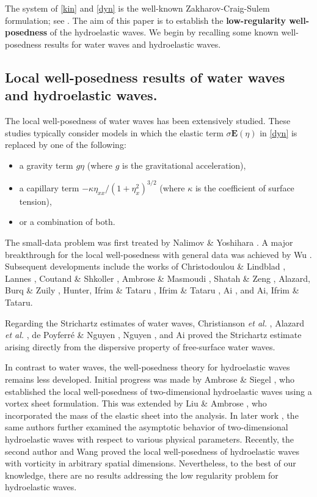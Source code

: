 \documentclass[10pt]{amsart}
\theoremstyle{remark}
\theoremstyle{definition}
\numberwithin{equation}{section}
\begin{document}
The system of \eqref{kin} and \eqref{dyn} is the well-known Zakharov-Craig-Sulem formulation; see \cite{MR2129655,MR1158383}.
 The aim of this paper is to establish the \textbf{low-regularity well-posedness} of the hydroelastic waves.
We begin by recalling some known well-posedness results for water waves and hydroelastic waves.

\subsection{Local well-posedness results of water waves and hydroelastic waves.}
The local well-posedness of water waves has been extensively studied.
These studies typically consider models in which the elastic term \(\sigma\mathbf{E}(\eta)\) in \eqref{dyn} is replaced by one of the following:
\begin{itemize}
    \item a gravity term \(g\eta\) (where \(g\) is the gravitational acceleration),
    \item a capillary term \(-\kappa \eta_{xx}/(1+\eta_x^2)^{3/2}\) (where \(\kappa\) is the coefficient of surface tension),
    \item or a combination of both.
\end{itemize}

The small-data problem was first treated by Nalimov \cite{MR609882} \& Yoshihara \cite{MR660822, MR728155}. A major breakthrough for the local well-posedness with general data was achieved by Wu \cite{MR1471885, MR1641609}. 
Subsequent developments include the works of Christodoulou \& Lindblad \cite{MR1780703}, Lannes \cite{MR2138139}, Coutand \& Shkoller \cite{MR2291920}, Ambrose \& Masmoudi \cite{MR2162781, MR2514378}, Shatah \& Zeng \cite{MR2388661,MR2400608,MR2763036}, Alazard, Burq \& Zuily \cite{MR2805065, MR3260858}, Hunter, Ifrim \& Tataru \cite{MR3535894}, Ifrim \& Tataru \cite{MR3667289}, Ai \cite{MR4161284, MR4098033}, and Ai, Ifrim \& Tataru\cite{AIT}.

Regarding the Strichartz estimates of water waves, Christianson \textit{et al.} \cite{MR2763354}, Alazard \textit{et al.} \cite{MR2931520,MR3852259}, de Poyferr\'{e} \& Nguyen  \cite{MR3487264}, Nguyen \cite{MR3724757}, and Ai \cite{MR4161284, MR4098033, A2023} proved the Strichartz estimate arising directly from the dispersive property of free-surface water waves.

In contrast to water waves, the well-posedness theory for hydroelastic waves remains less developed. Initial progress was made by Ambrose \& Siegel \cite{MR3656704}, who established the local well-posedness of two-dimensional hydroelastic waves using a vortex sheet formulation. This was extended by Liu \& Ambrose \cite{MR3608168}, who incorporated the mass of the elastic sheet into the analysis. In later work \cite{MR4850536}, the same authors further examined the asymptotic behavior of two-dimensional hydroelastic waves with respect to various physical parameters. Recently, the second author and Wang \cite{MR4104949} proved the local well-posedness of hydroelastic waves with vorticity in arbitrary spatial dimensions. Nevertheless, to the best of our knowledge, there are no results addressing the low regularity problem for hydroelastic waves.
\end{document}
